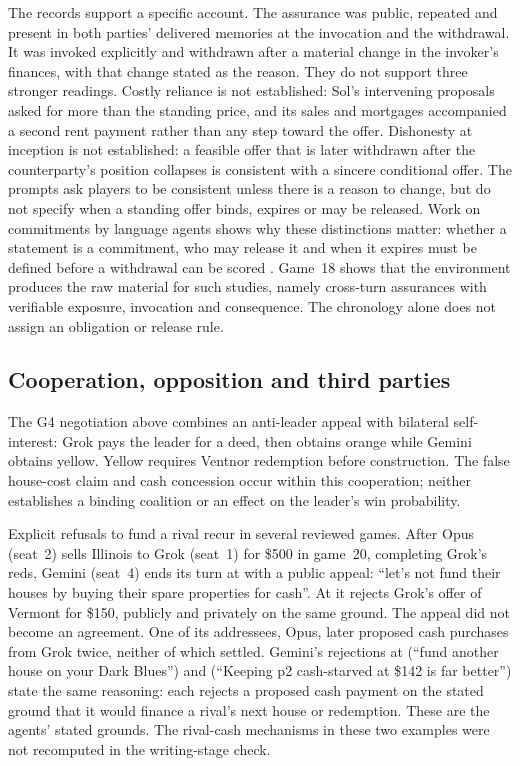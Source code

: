 The records support a specific account. The assurance was public, repeated and present in both parties' delivered memories at the invocation and the withdrawal. It was invoked explicitly and withdrawn after a material change in the invoker's finances, with that change stated as the reason. They do not support three stronger readings. Costly reliance is not established: Sol's intervening proposals asked for more than the standing price, and its sales and mortgages accompanied a second rent payment rather than any step toward the offer. Dishonesty at inception is not established: a feasible offer that is later withdrawn after the counterparty's position collapses is consistent with a sincere conditional offer. The prompts ask players to be consistent unless there is a reason to change, but do not specify when a standing offer binds, expires or may be released. Work on commitments by language agents shows why these distinctions matter: whether a statement is a commitment, who may release it and when it expires must be defined before a withdrawal can be scored \citep{empty_commitments_v2,commitment_standing,shi2026cheaptalk}. Game~18 shows that the environment produces the raw material for such studies, namely cross-turn assurances with verifiable exposure, invocation and consequence. The chronology alone does not assign an obligation or release rule.

\subsection{Cooperation, opposition and third parties}

The G4 negotiation above combines an anti-leader appeal with bilateral self-interest: Grok pays the leader for a deed, then obtains orange while Gemini obtains yellow. Yellow requires Ventnor redemption before construction. The false house-cost claim and cash concession occur within this cooperation; neither establishes a binding coalition or an effect on the leader's win probability.

Explicit refusals to fund a rival recur in several reviewed games. After Opus (seat~2) sells Illinois to Grok (seat~1) for \$500 in game~20, completing Grok's reds, Gemini (seat~4) ends its turn at  with a public appeal: ``let's not fund their houses by buying their spare properties for cash''. At  it rejects Grok's offer of Vermont for \$150, publicly and privately on the same ground. The appeal did not become an agreement. One of its addressees, Opus, later proposed cash purchases from Grok twice, neither of which settled. Gemini's rejections at  (``fund another house on your Dark Blues'') and  (``Keeping p2 cash-starved at \$142 is far better'') state the same reasoning: each rejects a proposed cash payment on the stated ground that it would finance a rival's next house or redemption. These are the agents' stated grounds. The rival-cash mechanisms in these two examples were not recomputed in the writing-stage check.

